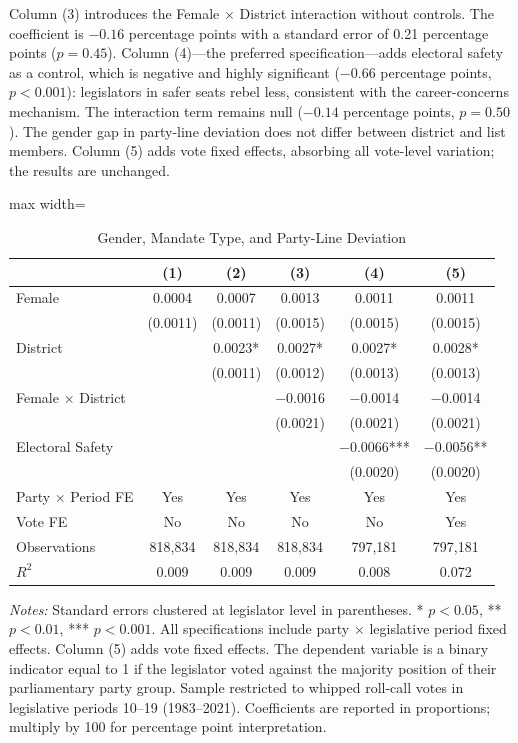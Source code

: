 \documentclass[12pt]{article}
\begin{document}
Column (3) introduces the Female $\times$ District interaction without controls. The coefficient is $-0.16$ percentage points with a standard error of 0.21 percentage points ($p = 0.45$). Column (4)---the preferred specification---adds electoral safety as a control, which is negative and highly significant ($-0.66$ percentage points, $p < 0.001$): legislators in safer seats rebel less, consistent with the career-concerns mechanism. The interaction term remains null ($-0.14$ percentage points, $p = 0.50$). The gender gap in party-line deviation does not differ between district and list members. Column (5) adds vote fixed effects, absorbing all vote-level variation; the results are unchanged.

\begin{table}[htbp]
\centering
\caption{Gender, Mandate Type, and Party-Line Deviation}
\label{tab:main}
\begin{adjustbox}{max width=\textwidth}
\begin{tabular}{lccccc}
\toprule
& (1) & (2) & (3) & (4) & (5) \\
\midrule
Female & 0.0004 & 0.0007 & 0.0013 & 0.0011 & 0.0011 \\
& (0.0011) & (0.0011) & (0.0015) & (0.0015) & (0.0015) \\
District & & 0.0023* & 0.0027* & 0.0027* & 0.0028* \\
& & (0.0011) & (0.0012) & (0.0013) & (0.0013) \\
Female $\times$ District & & & $-$0.0016 & $-$0.0014 & $-$0.0014 \\
& & & (0.0021) & (0.0021) & (0.0021) \\
Electoral Safety & & & & $-$0.0066*** & $-$0.0056** \\
& & & & (0.0020) & (0.0020) \\
\midrule
Party $\times$ Period FE & Yes & Yes & Yes & Yes & Yes \\
Vote FE & No & No & No & No & Yes \\
Observations & 818,834 & 818,834 & 818,834 & 797,181 & 797,181 \\
$R^2$ & 0.009 & 0.009 & 0.009 & 0.008 & 0.072 \\
\bottomrule
\end{tabular}
\end{adjustbox}
\begin{minipage}{0.95\textwidth}
\vspace{0.5em}
\footnotesize
\textit{Notes:} Standard errors clustered at legislator level in parentheses. * $p<0.05$, ** $p<0.01$, *** $p<0.001$. All specifications include party $\times$ legislative period fixed effects. Column (5) adds vote fixed effects. The dependent variable is a binary indicator equal to 1 if the legislator voted against the majority position of their parliamentary party group. Sample restricted to whipped roll-call votes in legislative periods 10--19 (1983--2021). Coefficients are reported in proportions; multiply by 100 for percentage point interpretation.
\end{minipage}
\end{table}
\end{document}
